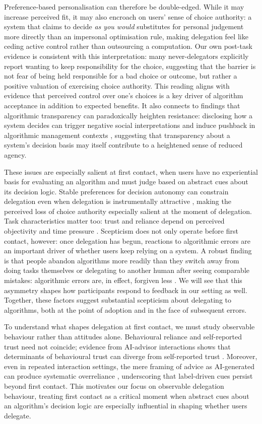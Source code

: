 \documentclass[a4paper, 12pt, fleqn]{article}
\theoremstyle{hypstyle}
\begin{document}
Preference-based personalisation can therefore be double-edged. While it may increase perceived fit, it may also encroach on users' sense of choice authority: a system that claims to decide \emph{as you would} substitutes for personal judgement more directly than an impersonal optimisation rule, making delegation feel like ceding active control rather than outsourcing a computation. Our own post-task evidence is consistent with this interpretation: many never-delegators explicitly report wanting to keep responsibility for the choice, suggesting that the barrier is not fear of being held responsible for a bad choice or outcome, but rather a positive valuation of exercising choice authority. This reading aligns with evidence that perceived control over one's choices is a key driver of algorithm acceptance \citep{Schaap2024} in addition to expected benefits. It also connects to findings that algorithmic transparency can paradoxically heighten resistance: disclosing how a system decides can trigger negative social interpretations \citep{Chen2024} and induce pushback in algorithmic management contexts \citep{Hu2024}, suggesting that transparency about a system's decision basis may itself contribute to a heightened sense of reduced agency.

These issues are especially salient at first contact, when users have no experiential basis for evaluating an algorithm and must judge based on abstract cues about its decision logic. Stable preferences for decision autonomy can constrain delegation even when delegation is instrumentally attractive \citep{Ivanova-Stenzel2025}, making the perceived loss of choice authority especially salient at the moment of delegation. Task characteristics matter too: trust and reliance depend on perceived objectivity and time pressure \citep{Yang2025}. Scepticism does not only operate before first contact, however: once delegation has begun, reactions to algorithmic errors are an important driver of whether users keep relying on a system. A robust finding is that people abandon algorithms more readily than they switch away from doing tasks themselves or delegating to another human after seeing comparable mistakes: algorithmic errors are, in effect, forgiven less \citep{Dietvorst2015,Renier2021}. We will see that this asymmetry shapes how participants respond to feedback in our setting as well. Together, these factors suggest substantial scepticism about delegating to algorithms, both at the point of adoption and in the face of subsequent errors.

To understand what shapes delegation at first contact, we must study observable behaviour rather than attitudes alone. Behavioural reliance and self-reported trust need not coincide; evidence from AI-advisor interactions shows that determinants of behavioural trust can diverge from self-reported trust \citep{Schreibelmayr2025}. Moreover, even in repeated interaction settings, the mere framing of advice as AI-generated can produce systematic overreliance \citep{Klingbeil2024}, underscoring that label-driven cues persist beyond first contact. This motivates our focus on observable delegation behaviour, treating first contact as a critical moment when abstract cues about an algorithm's decision logic are especially influential in shaping whether users delegate.
\end{document}
